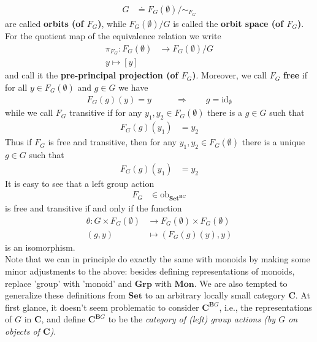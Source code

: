 \begin{exa}
\begin{align*}
  G
  &\doteq
  F_{G}(\emptyset)
  \slash
  \sim_{F_{G}}
\end{align*}
are called \textbf{orbits (of $F_{G}$)}, while $F_{G}(\emptyset) \slash G$ is called the \textbf{orbit space (of $F_{G}$)}.
For the quotient map of the equivalence relation we write
\begin{align*}
  \pi_{F_{G}}
  \colon
  F_{G}(\emptyset)
  &\rightarrow
  F_{G}(\emptyset)
  \slash
  G
  \\
  y
  \mapsto
  [y]
\end{align*}
and call it the \textbf{pre-principal projection (of $F_{G}$)}.
Moreover, we call $F_{G}$ \textbf{free} if for all $y \in F_{G}(\emptyset)$ and $g \in G$ we have
\begin{align*}
  F_{G}(g)(y)
  =
  y
  \qquad
  &\Rightarrow
  \qquad
  g
  =
  \mathrm{id}_{\emptyset}
\end{align*}
while we call $F_{G}$ transitive if for any $y_{1},y_{2} \in F_{G}(\emptyset)$ there is a $g \in G$ such that
\begin{align*}
  F_{G}(g)(y_{1})
  &=
  y_{2}
\end{align*}
Thus if $F_{G}$ is free and transitive, then for any $y_{1},y_{2} \in F_{G}(\emptyset)$ there is a unique $g \in G$ such that
\begin{align*}
  F_{G}(g)(y_{1})
  &=
  y_{2}
\end{align*}
It is easy to see that a left group action
\begin{align*}
  F_{G}
  &\in
  \mathrm{ob}_{\mathbf{Set}^{\mathbf{B}G}}
\end{align*}
is free and transitive if and only if the function
\begin{align*}
  \theta
  \colon
  G
  \times
  F_{G}(\emptyset)
  &\rightarrow
  F_{G}(\emptyset)
  \times
  F_{G}(\emptyset)
  \\
  (g,y)
  &\mapsto
  \left(
    F_{G}(g)(y),
    y
  \right)
\end{align*}
is an isomorphism.
\\
Note that we can in principle do exactly the same with monoids by making some minor adjustments to the above: besides defining representations of monoids, replace 'group' with 'monoid' and $\mathbf{Grp}$ with $\mathbf{Mon}$.
We are also tempted to generalize these definitions from $\mathbf{Set}$ to an arbitrary locally small category $\mathbf{C}$.
At first glance, it doesn't seem problematic to consider $\mathbf{C}^{\mathbf{B}G}$, i.e., the representations of $G$ in $\mathbf{C}$, and define $\mathbf{C}^{\mathbf{B}G}$ to be the \textit{category of (left) group actions (by $G$ on objects of $\mathbf{C}$)}.

\end{exa}
